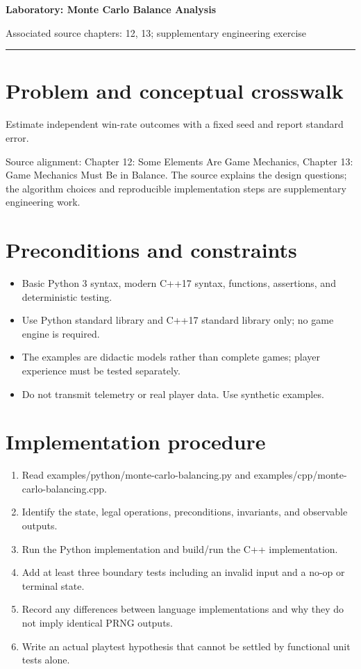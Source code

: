 \documentclass[11pt]{article}
\begin{document}
{\huge\bfseries\color{suiteblue} Laboratory: Monte Carlo Balance Analysis}\par
\vspace{0.15in}
{\normalsize\color{suitegray} Associated source chapters: 12, 13; supplementary engineering exercise}\par
\vspace{0.15in}\hrule\vspace{0.15in}

\section{Problem and conceptual crosswalk}
Estimate independent win-rate outcomes with a fixed seed and report standard error.

Source alignment: Chapter 12: Some Elements Are Game Mechanics, Chapter 13: Game Mechanics Must Be in Balance. The source explains the design questions; the algorithm choices and reproducible implementation steps are supplementary engineering work.


\section{Preconditions and constraints}
\begin{itemize}
\item Basic Python 3 syntax, modern C++17 syntax, functions, assertions, and deterministic testing.
\item Use Python standard library and C++17 standard library only; no game engine is required.
\item The examples are didactic models rather than complete games; player experience must be tested separately.
\item Do not transmit telemetry or real player data. Use synthetic examples.
\end{itemize}

\section{Implementation procedure}
\begin{enumerate}
\item Read examples/python/monte-carlo-balancing.py and examples/cpp/monte-carlo-balancing.cpp.
\item Identify the state, legal operations, preconditions, invariants, and observable outputs.
\item Run the Python implementation and build/run the C++ implementation.
\item Add at least three boundary tests including an invalid input and a no-op or terminal state.
\item Record any differences between language implementations and why they do not imply identical PRNG outputs.
\item Write an actual playtest hypothesis that cannot be settled by functional unit tests alone.
\end{enumerate}
\end{document}
